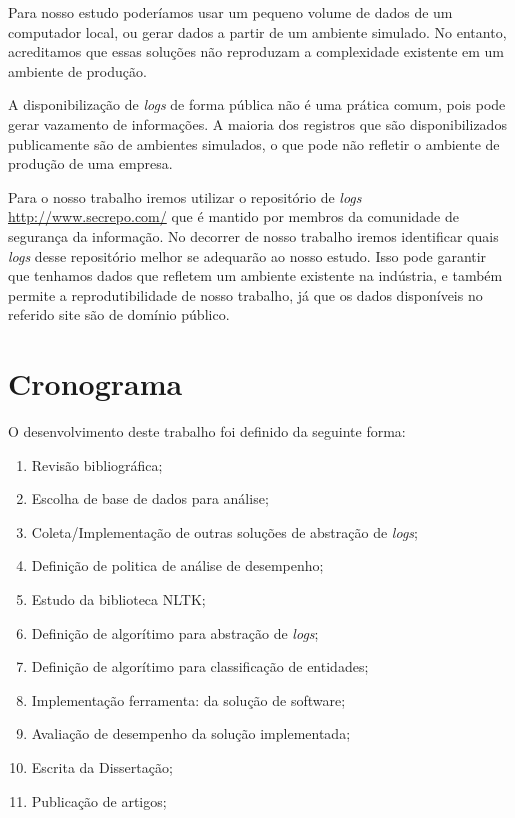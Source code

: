 \documentclass[
	12pt,				%
	openright,			%
	twoside,			%
	a4paper,			%
	english,			%
	spanish,			%
	brazil,				%
	]{abntex2}
\begin{document}
Para nosso estudo poderíamos usar um pequeno volume de dados de um computador local, ou gerar dados a partir de um ambiente simulado. No entanto, acreditamos que essas soluções não reproduzam a complexidade existente em um ambiente de produção.

A disponibilização de \emph{logs} de forma pública não é uma prática comum, pois pode gerar vazamento de informações. A maioria dos registros que são disponibilizados publicamente são de ambientes simulados, o que pode não refletir o ambiente de produção de uma empresa.

Para o nosso trabalho iremos utilizar o repositório de \emph{logs} \url{http://www.secrepo.com/} que é mantido por membros da comunidade de segurança da informação. No decorrer de nosso trabalho iremos identificar quais \emph{logs} desse repositório melhor se adequarão ao nosso estudo. Isso pode garantir que tenhamos dados que refletem um ambiente existente na indústria, e também permite a reprodutibilidade de nosso trabalho, já que os dados disponíveis no referido site são de domínio público.

\chapter{Cronograma}\label{chap:cronograma}
O desenvolvimento deste trabalho foi definido da seguinte forma:

\begin{enumerate}
	\item \label{rev-bibli} Revisão bibliográfica;
	\item \label{esc-base} Escolha de base de dados para análise;
	\item \label{imp-outras} Coleta/Implementação de outras soluções de abstração de \emph{logs};
	\item \label{def-pol} Definição de politica de análise de desempenho;
	\item \label{est-nltk} Estudo da biblioteca NLTK;
	\item \label{algo-abs} Definição de algorítimo para abstração de \emph{logs};
	\item \label{algo-clas} Definição de algorítimo para classificação de entidades;
	\item \label{imp-sol} Implementação ferramenta: da solução de software;
	\item \label{ava-des} Avaliação de desempenho da solução implementada;
	\item \label{esc-dis} Escrita da Dissertação;
	\item \label{pub-art} Publicação de artigos;
\end{enumerate}
\end{document}
